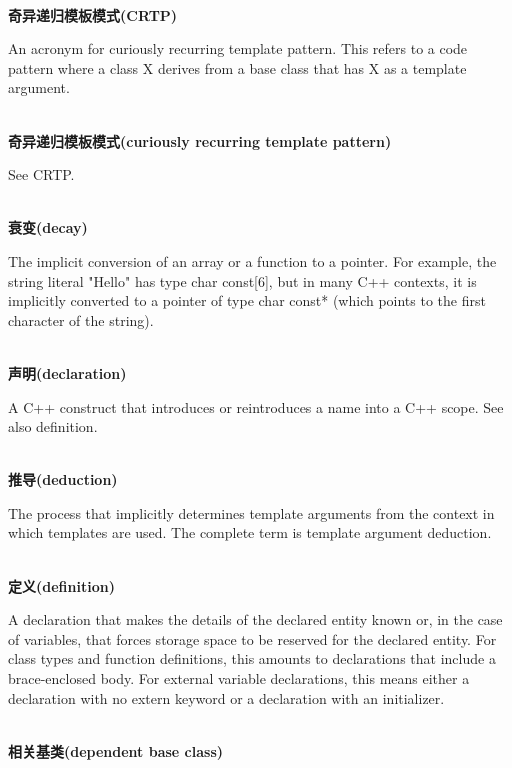 \hspace*{\fill} \\ %
\noindent
\textbf{奇异递归模板模式(CRTP)}

An acronym for curiously recurring template pattern. This refers to a code pattern where a class X derives from a base class that has X as a template argument.

\hspace*{\fill} \\ %
\noindent
\textbf{奇异递归模板模式(curiously recurring template pattern)}

See CRTP.

\hspace*{\fill} \\ %
\noindent
\textbf{衰变(decay)}

The implicit conversion of an array or a function to a pointer. For example, the string literal "Hello" has type char const[6], but in many C++ contexts, it is implicitly converted to a pointer of type char const* (which points to the first character of the string).

\hspace*{\fill} \\ %
\noindent
\textbf{声明(declaration)}

A C++ construct that introduces or reintroduces a name into a C++ scope. See also definition.

\hspace*{\fill} \\ %
\noindent
\textbf{推导(deduction)}

The process that implicitly determines template arguments from the context in which templates are used. The complete term is template argument deduction.

\hspace*{\fill} \\ %
\noindent
\textbf{定义(definition)}

A declaration that makes the details of the declared entity known or, in the case of variables, that forces storage space to be reserved for the declared entity. For class types and function definitions, this amounts to declarations that include a brace-enclosed body. For external variable declarations, this means either a declaration with no extern keyword or a declaration with an initializer.

\hspace*{\fill} \\ %
\noindent
\textbf{相关基类(dependent base class)}

